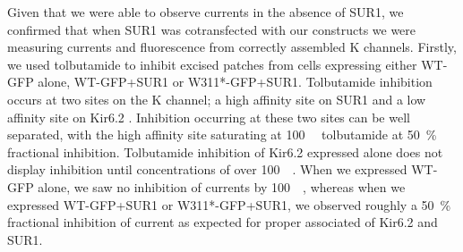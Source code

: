 Given that we were able to observe currents in the absence of SUR1, we confirmed that when SUR1 was cotransfected with our constructs we were measuring currents and fluorescence from correctly assembled K\ATP{} channels.
Firstly, we used tolbutamide to inhibit excised patches from cells expressing either WT-GFP alone, WT-GFP+SUR1 or W311*-GFP+SUR1.
Tolbutamide inhibition occurs at two sites on the K\ATP{} channel; a high affinity site on SUR1 and a low affinity site on Kir6.2 \cite{gribble_tissue_1998, ashfield_identification_1999}.
Inhibition occurring at these two sites can be well separated, with the high affinity site saturating at \SI{100}{\micro\Molar} tolbutamide at \SI{50}{\percent} fractional inhibition.
Tolbutamide inhibition of Kir6.2 expressed alone does not display inhibition until concentrations of over \SI{100}{\micro\Molar}.
When we expressed WT-GFP alone, we saw no inhibition of currents by \SI{100}{\micro\Molar}, whereas when we expressed WT-GFP+SUR1 or W311*-GFP+SUR1, we observed roughly a \SI{50}{\percent} fractional inhibition of current as expected for proper associated of Kir6.2 and SUR1.

